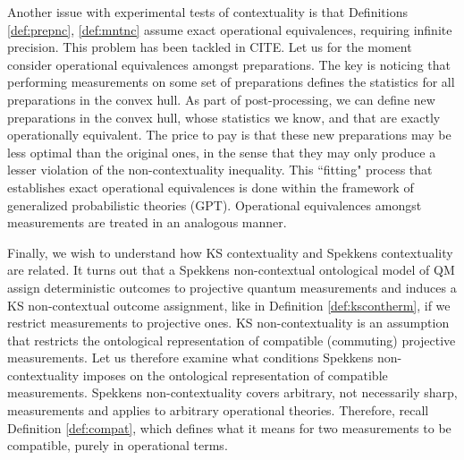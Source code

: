 Another issue with experimental tests of contextuality is that Definitions \ref{def:prepnc}, \ref{def:mntnc} assume exact operational equivalences, requiring infinite precision. This problem has been tackled in CITE. Let us for the moment consider operational equivalences amongst preparations. The key is noticing that performing measurements on some set of preparations defines the statistics for all preparations in the convex hull. As part of post-processing, we can define new preparations in the convex hull, whose statistics we know, and that are exactly operationally equivalent. The price to pay is that these new preparations may be less optimal than the original ones, in the sense that they may only produce a lesser violation of the non-contextuality inequality. This ``fitting" process that establishes exact operational equivalences is done within the framework of generalized probabilistic theories (GPT). Operational equivalences amongst measurements are treated in an analogous manner.

Finally, we wish to understand how KS contextuality and Spekkens contextuality are related. It turns out that a Spekkens non-contextual ontological model of QM assign deterministic outcomes to projective quantum measurements and induces a KS non-contextual outcome assignment, like in Definition \ref{def:kscontherm}, if we restrict measurements to projective ones. 
KS non-contextuality is an assumption that restricts the ontological representation of compatible (commuting) projective measurements. Let us therefore examine what conditions Spekkens non-contextuality imposes on the ontological representation of compatible measurements. Spekkens non-contextuality covers arbitrary, not necessarily sharp, measurements and applies to arbitrary operational theories. Therefore, recall Definition \ref{def:compat}, which defines what it means for two measurements to be compatible, purely in operational terms.


